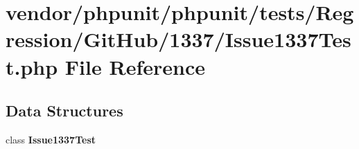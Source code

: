 \section{vendor/phpunit/phpunit/tests/\+Regression/\+Git\+Hub/1337/\+Issue1337\+Test.php File Reference}
\label{_issue1337_test_8php}
\subsection*{Data Structures}
\begin{DoxyCompactItemize}
\item 
class {\bf Issue1337\+Test}
\end{DoxyCompactItemize}

